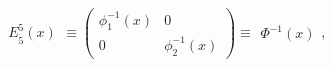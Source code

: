 \begin{equation} \label{VIEL}
\begin{array}{c}
    E^{5}_{\dot 5}(x)
    \end{array} \equiv
\left(\begin{array}{cc}
    \phi_1^{-1}(x) &  0 \\
    0     & \phi_2^{-1}(x)
    \end{array}\right) \equiv
\begin{array}{c}
    \Phi^{-1}(x)
    \end{array},
\end{equation}

